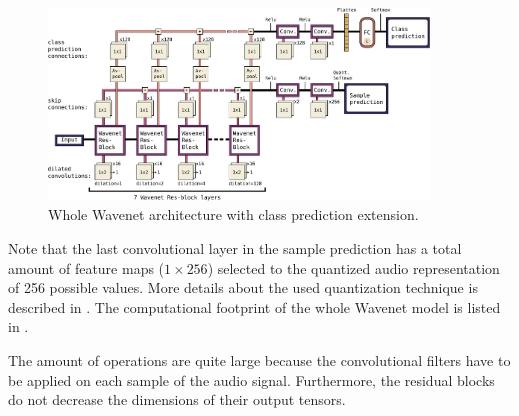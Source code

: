 \begin{figure}[!ht]
  \centering
    \includegraphics[width=0.9\textwidth]{./4_nn/figs/nn_arch_wavenet_all.pdf}
  \caption{Whole Wavenet architecture with class prediction extension.}
  \label{fig:nn_arch_wavenet_all}
\end{figure}
\FloatBarrier
\noindent
Note that the last convolutional layer in the sample prediction has a total amount of feature maps ($1 \times 256$) selected to the quantized audio representation of 256 possible values.
More details about the used quantization technique is described in \cite{Oord2016}.
The computational footprint of the whole Wavenet model is listed in .

The amount of operations are quite large because the convolutional filters have to be applied on each sample of the audio signal.
Furthermore, the residual blocks do not decrease the dimensions of their output tensors.